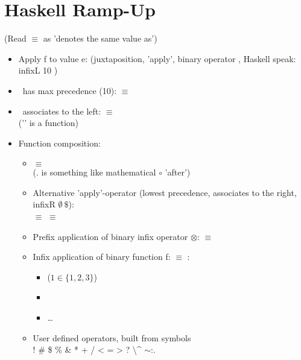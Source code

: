 
\chapter{Haskell Ramp-Up} %
\label{cha:haskell_ramp_up}

(Read $\equiv$ as 'denotes the same value as')

\begin{itemize}
    \item Apply f to value e:  (juxtaposition, 'apply', binary operator \textvisiblespace, Haskell speak: infixL 10 \textvisiblespace)
    \item \textvisiblespace\ has max precedence (10):  $\equiv$ 
    \item \textvisiblespace\ associates to the left:  $\equiv$  \\ ('' is a function) \item Function composition: \begin{itemize}
        \item {} $\equiv$  \\ (. is something like mathematical $\circ$ 'after')
        \item Alternative 'apply'-operator \codeline{\$} (lowest precedence, associates to the right, infixR $\emptyset\ \$$):\\
             $\equiv$  $\equiv$ 
        \item Prefix application of binary infix operator $\otimes$:  $\equiv$  
        \item Infix application of binary function f:  $\equiv$ :
        \begin{itemize}
            \item {}   ($1 \in \{1,2,3\}$)
            \item {}
            \item \dots
        \end{itemize}
        \item User defined operators, built from symbols \\ ! \# \$ \% \& * + / < = > ? \@ \textbackslash \string^ \textbar $\sim$:.
    \end{itemize}
\end{itemize} 



